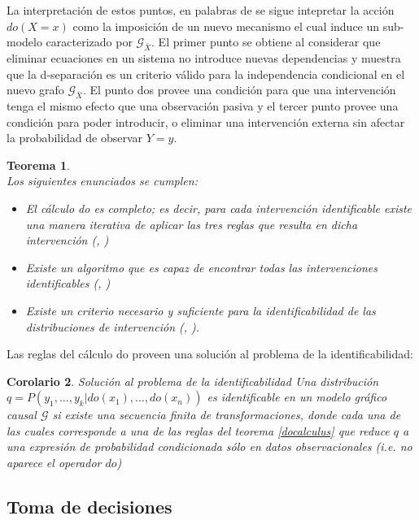 \documentclass[11pt]{article}
\theoremstyle{plain}
\newtheorem{teo}{Teorema}
\newtheorem{cor}[teo]{Corolario}
\begin{document}
		La interpretación de estos puntos, en palabras de \cite{pearl2009causality} se sigue intepretar la acción $do(X=x)$ como la imposición de un nuevo mecanismo el cual induce un sub-modelo caracterizado por $\mathcal{G}_{\bar{X}}$. El primer punto se obtiene al considerar que eliminar ecuaciones en un sistema no introduce nuevas dependencias y muestra que la d-separación es un criterio válido para la independencia condicional en el nuevo grafo $\mathcal{G}_{\bar{X}}$. El punto dos provee una condición para que una intervención tenga el mismo efecto que una observación pasiva y el tercer punto provee una condición para poder introducir, o eliminar una intervención externa sin afectar la probabilidad de observar $Y=y$.
		\begin{teo}{\cite{peters2017elements}}\\
		Los siguientes enunciados se cumplen:
		\begin{itemize}
		\item El cálculo do es completo; es decir, para cada intervención identificable existe una manera iterativa de aplicar las tres reglas que resulta en dicha intervención (\cite{huang2006pearl}, \cite{shpitser2006identification})
		\item Existe un algoritmo que es capaz de encontrar todas las intervenciones identificables (\cite{tian2002}, \cite{huang2006pearl})
		\item Existe un criterio necesario y suficiente para la identificabilidad de las distribuciones de intervención (\cite{shpitser2006identification}, \cite{huang2006pearl}).
		\end{itemize}
		\end{teo}
		Las reglas del cálculo do proveen una solución al problema de la identificabilidad:
		\begin{cor} Solución al problema de la identificabilidad
		Una distribución $q=P(y_1,...,y_k | do(x_1),...,do(x_n))$ es identificable en un modelo gráfico causal $\mathcal{G}$ si existe una secuencia finita de transformaciones, donde cada una de las cuales corresponde a una de las reglas del teorema \ref{docalculus} que reduce $q$ a una expresión de probabilidad condicionada sólo en datos observacionales (i.e. no aparece el operador $do$)
		\end{cor}
	\subsection{Toma de decisiones}
\end{document}
